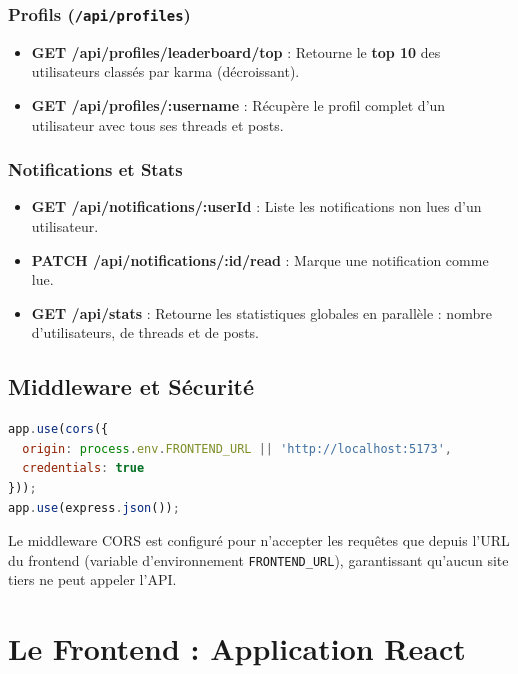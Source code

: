 \documentclass[12pt, a4paper]{report}
\begin{document}
\subsection{Profils (\texttt{/api/profiles})}

\begin{itemize}
    \item \textbf{GET /api/profiles/leaderboard/top} : Retourne le \textbf{top 10} des utilisateurs classés par karma (décroissant).
    \item \textbf{GET /api/profiles/:username} : Récupère le profil complet d'un utilisateur avec tous ses threads et posts.
\end{itemize}

\subsection{Notifications et Stats}

\begin{itemize}
    \item \textbf{GET /api/notifications/:userId} : Liste les notifications non lues d'un utilisateur.
    \item \textbf{PATCH /api/notifications/:id/read} : Marque une notification comme lue.
    \item \textbf{GET /api/stats} : Retourne les statistiques globales en parallèle : nombre d'utilisateurs, de threads et de posts.
\end{itemize}

\section{Middleware et Sécurité}

\begin{lstlisting}[language=JavaScript, caption={Configuration des middlewares dans index.js.}]
app.use(cors({
  origin: process.env.FRONTEND_URL || 'http://localhost:5173',
  credentials: true
}));
app.use(express.json());
\end{lstlisting}

Le middleware CORS est configuré pour n'accepter les requêtes que depuis l'URL du frontend (variable d'environnement \texttt{FRONTEND\_URL}), garantissant qu'aucun site tiers ne peut appeler l'API.


\chapter{Le Frontend : Application React}
\end{document}
